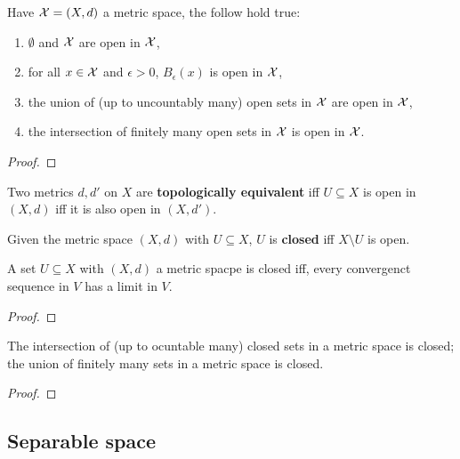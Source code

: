 \documentclass[../Year2.tex]{subfiles}
\begin{document}
\begin{proposition}
    Have $\mathcal{X}=(X,d)$ a metric space, the follow hold true: \begin{enumerate}
        \item $\emptyset$ and $\mathcal{X}$ are open in $\mathcal{X}$,
        \item for all $x\in\mathcal{X}$ and $\epsilon>0$, $B_\epsilon(x)$ is open in $\mathcal{X}$,
        \item the union of (up to uncountably many) open sets in $\mathcal{X}$ are open in $\mathcal{X}$,
        \item the intersection of finitely many open sets in $\mathcal{X}$ is open in $\mathcal{X}$.
    \end{enumerate}
    \begin{proof}
        
    \end{proof}
\end{proposition}

\begin{definition}
    Two metrics $d,d'$ on $X$ are \textbf{topologically equivalent} iff $U\subseteq X$ is open in $(X,d)$ iff it is also open in $(X,d')$.
\end{definition}

\begin{definition}
    Given the metric space $(X,d)$ with $U\subseteq X$, $U$ is \textbf{closed} iff $X\setminus U$ is open.
\end{definition}

\begin{proposition}
    A set $U\subseteq X$ with $(X,d)$ a metric spacpe is closed iff, every convergenct sequence in $V$ has a limit in $V$.
    \begin{proof}
        
    \end{proof}
\end{proposition}

\begin{proposition}
    The intersection of (up to ocuntable many) closed sets in a metric space is closed; the union of finitely many sets in a metric space is closed.
    \begin{proof}
        
    \end{proof}
\end{proposition}

\subsection{Separable space}
\end{document}
